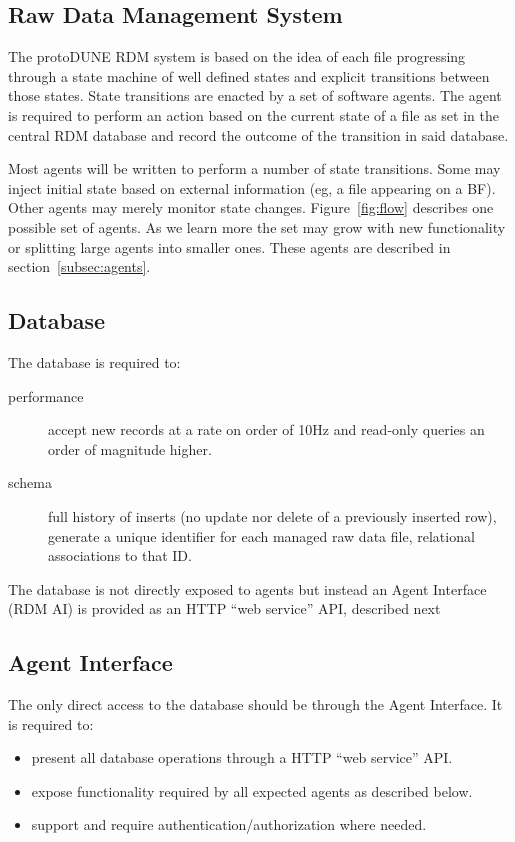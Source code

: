 \documentclass[pdftex,12pt,letter]{article}
\begin{document}
\subsection{Raw Data Management System}

The protoDUNE RDM system is based on the idea of each file progressing
through a state machine of well defined states and explicit
transitions between those states.  State transitions are enacted by a
set of software agents.  The agent is required to perform an action
based on the current state of a file as set in the central RDM
database and record the outcome of the transition in said database.

Most agents will be written to perform a number of state transitions.
Some may inject initial state based on external information (eg, a
file appearing on a BF).  Other agents may merely monitor state
changes.  Figure~\ref{fig:flow} describes one possible set of agents.
As we learn more the set may grow with new functionality or splitting
large agents into smaller ones.  These agents are described in
section~\ref{subsec:agents}.

\subsection{Database}

The database is required to:
\begin{description}
\item[performance] accept new records at a rate on order of 10Hz and
  read-only queries an order of magnitude higher.
\item[schema] full history of inserts (no update nor delete of a
  previously inserted row), generate a unique identifier for each managed
  raw data file, relational associations to that ID.
\end{description}
The database is not directly exposed to agents but instead an Agent
Interface (RDM AI) is provided as an HTTP ``web service'' API,
described next


\subsection{Agent Interface}

The only direct access to the database should be through the Agent
Interface.  It is required to:
\begin{itemize}
\item present all database operations through a HTTP ``web service'' API.
\item expose functionality required by all expected agents as described below.
\item support and require authentication/authorization where needed.
\end{itemize}
\end{document}
